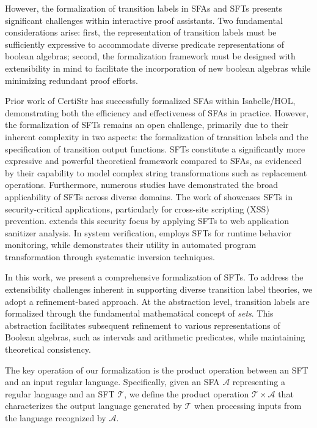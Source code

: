 \documentclass[a4paper,UKenglish,cleveref, autoref, thm-restate]{lipics-v2021}
\begin{document}
However, the formalization of transition labels in SFAs and SFTs presents significant challenges within interactive proof assistants. Two fundamental considerations arise: first, the representation of transition labels must be sufficiently expressive to accommodate diverse predicate representations of boolean algebras; second, the formalization framework must be designed with extensibility in mind to facilitate the incorporation of new boolean algebras while minimizing redundant proof efforts.




Prior work of CertiStr \cite{cpp/KanLRS22} has successfully formalized SFAs within Isabelle/HOL, demonstrating both the efficiency and effectiveness of SFAs in practice. However, the formalization of SFTs remains an open challenge, primarily due to their inherent complexity in two aspects: the formalization of transition labels and the specification of transition output functions. SFTs constitute a significantly more expressive and powerful theoretical framework compared to  SFAs, as evidenced by their capability to model complex string transformations such as replacement operations.
%
Furthermore, numerous studies have demonstrated the broad applicability of SFTs across diverse domains. The work of \cite{VeanesHLMB12Transducer} showcases SFTs in security-critical applications, particularly for cross-site scripting (XSS) prevention. \cite{uss/HooimeijerLMSV11} extends this security focus by applying SFTs to web application sanitizer analysis. In system verification, \cite{osdi/YaseenABCL20} employs SFTs for runtime behavior monitoring, while \cite{pldi/HuD17} demonstrates their utility in automated program transformation through systematic inversion techniques.



 
In this work, we present a comprehensive formalization of SFTs. To address the extensibility challenges inherent in supporting diverse transition label theories, we adopt a refinement-based approach. At the abstraction level, transition labels are formalized through the fundamental mathematical concept of \emph{sets}. This abstraction facilitates subsequent refinement to various representations of Boolean algebras, such as intervals and arithmetic predicates, while maintaining theoretical consistency.

The key operation of our formalization is the product operation between an SFT and an input regular language. Specifically, given an SFA $\mathcal{A}$ representing a regular language and an SFT $\mathcal{T}$, we define the product operation $\mathcal{T} \times\mathcal{A}$ that characterizes the output language generated by $\mathcal{T}$ when processing inputs from the language recognized by $\mathcal{A}$.
\end{document}
